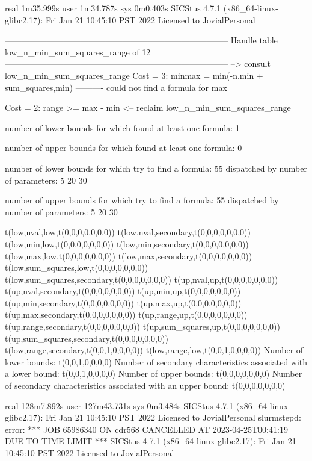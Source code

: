 real	1m35.999s
user	1m34.787s
sys	0m0.403s
SICStus 4.7.1 (x86_64-linux-glibc2.17): Fri Jan 21 10:45:10 PST 2022
Licensed to JovialPersonal


--------------------------------------------------------------------------------
Handle table low_n_min_sum_squares_range of 12
--------------------------------------------------------------------------------
--> consult low_n_min_sum_squares_range
Cost =  3:  minmax = min(-n.min + sum_squares,min)
----------
could not find a formula for max

Cost =  2:  range >= max - min
<-- reclaim low_n_min_sum_squares_range

number of lower bounds for which found at least one formula: 1

number of upper bounds for which found at least one formula: 0

number of lower bounds for which try to find a formula: 55
dispatched by number of parameters: 5  20  30

number of upper bounds for which try to find a formula: 55
dispatched by number of parameters: 5  20  30

t(low,nval,low,t(0,0,0,0,0,0,0))
t(low,nval,secondary,t(0,0,0,0,0,0,0))
t(low,min,low,t(0,0,0,0,0,0,0))
t(low,min,secondary,t(0,0,0,0,0,0,0))
t(low,max,low,t(0,0,0,0,0,0,0))
t(low,max,secondary,t(0,0,0,0,0,0,0))
t(low,sum_squares,low,t(0,0,0,0,0,0,0))
t(low,sum_squares,secondary,t(0,0,0,0,0,0,0))
t(up,nval,up,t(0,0,0,0,0,0,0))
t(up,nval,secondary,t(0,0,0,0,0,0,0))
t(up,min,up,t(0,0,0,0,0,0,0))
t(up,min,secondary,t(0,0,0,0,0,0,0))
t(up,max,up,t(0,0,0,0,0,0,0))
t(up,max,secondary,t(0,0,0,0,0,0,0))
t(up,range,up,t(0,0,0,0,0,0,0))
t(up,range,secondary,t(0,0,0,0,0,0,0))
t(up,sum_squares,up,t(0,0,0,0,0,0,0))
t(up,sum_squares,secondary,t(0,0,0,0,0,0,0))
t(low,range,secondary,t(0,0,1,0,0,0,0))
t(low,range,low,t(0,0,1,0,0,0,0))
Number of lower bounds:                                             t(0,0,1,0,0,0,0)
Number of secondary characteristics associated with a lower bound:  t(0,0,1,0,0,0,0)
Number of upper bounds:                                             t(0,0,0,0,0,0,0)
Number of secondary characteristics associated with an upper bound: t(0,0,0,0,0,0,0)

real	128m7.892s
user	127m43.731s
sys	0m3.484s
SICStus 4.7.1 (x86_64-linux-glibc2.17): Fri Jan 21 10:45:10 PST 2022
Licensed to JovialPersonal
slurmstepd: error: *** JOB 65986340 ON cdr568 CANCELLED AT 2023-04-25T00:41:19 DUE TO TIME LIMIT ***
SICStus 4.7.1 (x86_64-linux-glibc2.17): Fri Jan 21 10:45:10 PST 2022
Licensed to JovialPersonal


